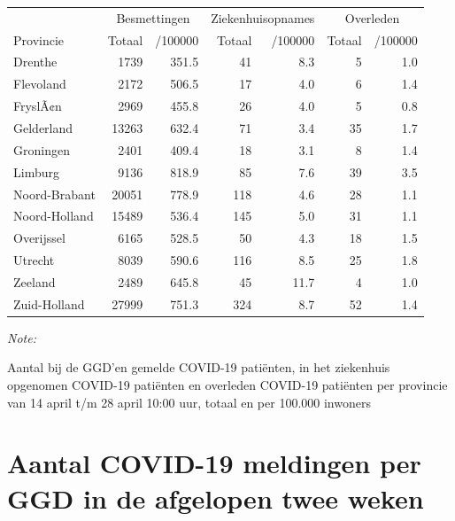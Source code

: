 \documentclass[
  english,
  man,floatsintext]{apa6}
\begin{document}
\begin{table}
\centering
\begin{threeparttable}
\begin{tabular}{lrrrrrr}
\toprule
\multicolumn{1}{c}{ } & \multicolumn{2}{c}{Besmettingen} & \multicolumn{2}{c}{Ziekenhuisopnames} & \multicolumn{2}{c}{Overleden} \\
\cmidrule(l{3pt}r{3pt}){2-3} \cmidrule(l{3pt}r{3pt}){4-5} \cmidrule(l{3pt}r{3pt}){6-7}
Provincie & Totaal & /100000 & Totaal & /100000 & Totaal & /100000\\
\midrule
Drenthe & 1739 & 351.5 & 41 & 8.3 & 5 & 1.0\\
Flevoland & 2172 & 506.5 & 17 & 4.0 & 6 & 1.4\\
FryslÃ¢n & 2969 & 455.8 & 26 & 4.0 & 5 & 0.8\\
Gelderland & 13263 & 632.4 & 71 & 3.4 & 35 & 1.7\\
Groningen & 2401 & 409.4 & 18 & 3.1 & 8 & 1.4\\
Limburg & 9136 & 818.9 & 85 & 7.6 & 39 & 3.5\\
Noord-Brabant & 20051 & 778.9 & 118 & 4.6 & 28 & 1.1\\
Noord-Holland & 15489 & 536.4 & 145 & 5.0 & 31 & 1.1\\
Overijssel & 6165 & 528.5 & 50 & 4.3 & 18 & 1.5\\
Utrecht & 8039 & 590.6 & 116 & 8.5 & 25 & 1.8\\
Zeeland & 2489 & 645.8 & 45 & 11.7 & 4 & 1.0\\
Zuid-Holland & 27999 & 751.3 & 324 & 8.7 & 52 & 1.4\\
\bottomrule
\end{tabular}
\begin{tablenotes}
\item \textit{Note: } 
\item Aantal bij de GGD’en gemelde COVID-19 patiënten, in het ziekenhuis opgenomen COVID-19 patiënten en overleden COVID-19 patiënten per provincie van 14 april t/m 28 april 10:00 uur, totaal en per 100.000 inwoners
\end{tablenotes}
\end{threeparttable}
\end{table}

\newpage

\hypertarget{aantal-covid-19-meldingen-per-ggd-in-de-afgelopen-twee-weken}{%
\section{Aantal COVID-19 meldingen per GGD in de afgelopen twee weken}\label{aantal-covid-19-meldingen-per-ggd-in-de-afgelopen-twee-weken}}
\end{document}
